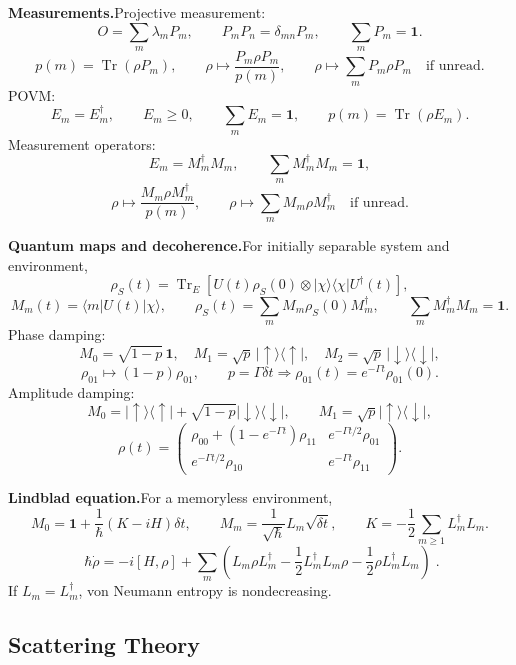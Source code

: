 \noindent\textbf{Measurements.}\quad Projective measurement:
\[
O=\sum_m\lambda_mP_m,\qquad
P_mP_n=\delta_{mn}P_m,\qquad \sum_mP_m=\mathbf{1}.
\]
\[
p(m)=\operatorname{Tr}(\rho P_m),\qquad
\rho\mapsto\frac{P_m\rho P_m}{p(m)},\qquad
\rho\mapsto\sum_mP_m\rho P_m\quad\text{if unread}.
\]
POVM:
\[
E_m=E_m^\dagger,\qquad E_m\ge0,\qquad \sum_mE_m=\mathbf{1},\qquad
p(m)=\operatorname{Tr}(\rho E_m).
\]
Measurement operators:
\[
E_m=M_m^\dagger M_m,\qquad \sum_mM_m^\dagger M_m=\mathbf{1},
\]
\[
\rho\mapsto\frac{M_m\rho M_m^\dagger}{p(m)},\qquad
\rho\mapsto\sum_mM_m\rho M_m^\dagger\quad\text{if unread}.
\]

\noindent\textbf{Quantum maps and decoherence.}\quad For initially separable system
and environment,
\[
\rho_S(t)=\operatorname{Tr}_E[U(t)\rho_S(0)\otimes|\chi\rangle\langle\chi|U^\dagger(t)],
\]
\[
M_m(t)=\langle m|U(t)|\chi\rangle,\qquad
\rho_S(t)=\sum_mM_m\rho_S(0)M_m^\dagger,\qquad
\sum_mM_m^\dagger M_m=\mathbf{1}.
\]
Phase damping:
\[
M_0=\sqrt{1-p}\,\mathbf{1},\quad
M_1=\sqrt p\,|\uparrow\rangle\langle\uparrow|,\quad
M_2=\sqrt p\,|\downarrow\rangle\langle\downarrow|,
\]
\[
\rho_{01}\mapsto(1-p)\rho_{01},\qquad
p=\Gamma\delta t\Longrightarrow \rho_{01}(t)=e^{-\Gamma t}\rho_{01}(0).
\]
Amplitude damping:
\[
M_0=|\uparrow\rangle\langle\uparrow|
+\sqrt{1-p}|\downarrow\rangle\langle\downarrow|,\qquad
M_1=\sqrt p|\uparrow\rangle\langle\downarrow|,
\]
\[
\rho(t)=
\begin{pmatrix}
\rho_{00}+(1-e^{-\Gamma t})\rho_{11}&e^{-\Gamma t/2}\rho_{01}\\
e^{-\Gamma t/2}\rho_{10}&e^{-\Gamma t}\rho_{11}
\end{pmatrix}.
\]

\noindent\textbf{Lindblad equation.}\quad For a memoryless environment,
\[
M_0=\mathbf{1}+\frac1{\hbar}(K-iH)\delta t,\qquad
M_m=\frac1{\sqrt\hbar}L_m\sqrt{\delta t},\qquad
K=-\frac12\sum_{m\ge1}L_m^\dagger L_m.
\]
\[
\boxed{\;\hbar\dot\rho=-i[H,\rho]
+\sum_m\left(L_m\rho L_m^\dagger
-\frac12L_m^\dagger L_m\rho-\frac12\rho L_m^\dagger L_m\right)\;}.
\]
If $L_m=L_m^\dagger$, von Neumann entropy is nondecreasing.

\subsection{Scattering Theory}

